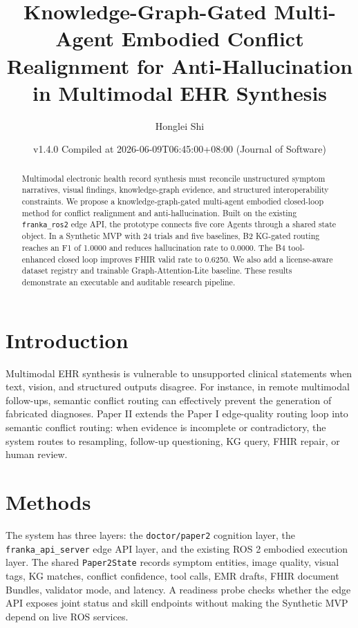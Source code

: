 \documentclass[11pt]{article}
\title{Knowledge-Graph-Gated Multi-Agent Embodied Conflict Realignment for Anti-Hallucination in Multimodal EHR Synthesis}
\author{Honglei Shi}
\date{v1.4.0 Compiled at 2026-06-09T06:45:00+08:00 (Journal of Software)}
\begin{document}
\maketitle

\begin{abstract}
Multimodal electronic health record synthesis must reconcile unstructured symptom narratives, visual findings, knowledge-graph evidence, and structured interoperability constraints. We propose a knowledge-graph-gated multi-agent embodied closed-loop method for conflict realignment and anti-hallucination. Built on the existing \texttt{franka\_ros2} edge API, the prototype connects five core Agents through a shared state object. In a Synthetic MVP with 24 trials and five baselines, B2 KG-gated routing reaches an F1 of 1.0000 and reduces hallucination rate to 0.0000. The B4 tool-enhanced closed loop improves FHIR valid rate to 0.6250. We also add a license-aware dataset registry and trainable Graph-Attention-Lite baseline. These results demonstrate an executable and auditable research pipeline.
\end{abstract}

\section{Introduction}
Multimodal EHR synthesis is vulnerable to unsupported clinical statements when text, vision, and structured outputs disagree. For instance, in remote multimodal follow-ups, semantic conflict routing can effectively prevent the generation of fabricated diagnoses. Paper II extends the Paper I edge-quality routing loop into semantic conflict routing: when evidence is incomplete or contradictory, the system routes to resampling, follow-up questioning, KG query, FHIR repair, or human review.

\section{Methods}
The system has three layers: the \texttt{doctor/paper2} cognition layer, the \texttt{franka\_api\_server} edge API layer, and the existing ROS 2 embodied execution layer. The shared \texttt{Paper2State} records symptom entities, image quality, visual tags, KG matches, conflict confidence, tool calls, EMR drafts, FHIR document Bundles, validator mode, and latency. A readiness probe checks whether the edge API exposes joint status and skill endpoints without making the Synthetic MVP depend on live ROS services.
\end{document}
